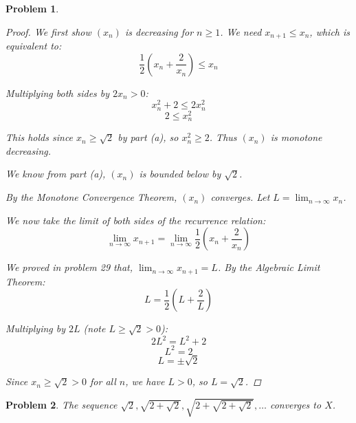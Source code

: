 \documentclass[12pt]{article}
\newtheorem{problem}{Problem}
\begin{document}
\begin{problem}
\begin{enumerate}
\begin{proof}
We first show $(x_n)$ is decreasing for $n \geq 1$. We need $x_{n+1} \leq x_n$, which is equivalent to:
$$\frac{1}{2}\left(x_n + \frac{2}{x_n}\right) \leq x_n$$

Multiplying both sides by $2x_n > 0$:
$$x_n^2 + 2 \leq 2x_n^2$$
$$2 \leq x_n^2$$

This holds since $x_n \geq \sqrt{2}$ by part (a), so $x_n^2 \geq 2$. Thus $(x_n)$ is monotone decreasing.

We know from part (a), $(x_n)$ is bounded below by $\sqrt{2}$.

By the Monotone Convergence Theorem, $(x_n)$ converges. Let $L = \lim_{n\to\infty} x_n$.

We now take the limit of both sides of the recurrence relation:
$$\lim_{n\to\infty} x_{n+1} = \lim_{n\to\infty} \frac{1}{2}\left(x_n + \frac{2}{x_n}\right)$$

We proved in problem 29 that, $\lim_{n\to\infty} x_{n+1} = L$. By the Algebraic Limit Theorem:
$$L = \frac{1}{2}\left(L + \frac{2}{L}\right)$$

Multiplying by $2L$ (note $L \geq \sqrt{2} > 0$):
$$2L^2 = L^2 + 2$$
$$L^2 = 2$$
$$L = \pm\sqrt{2}$$

Since $x_n \geq \sqrt{2} > 0$ for all $n$, we have $L > 0$, so $L = \sqrt{2}$.
\end{proof}

\end{enumerate}
\end{problem}


\begin{problem} %
The sequence $\displaystyle \sqrt{2}, \sqrt{2+\sqrt{2}}, \sqrt{2 + \sqrt{2+\sqrt{2}}}, \dots$ converges to $X$.
\end{problem}

\end{document}
